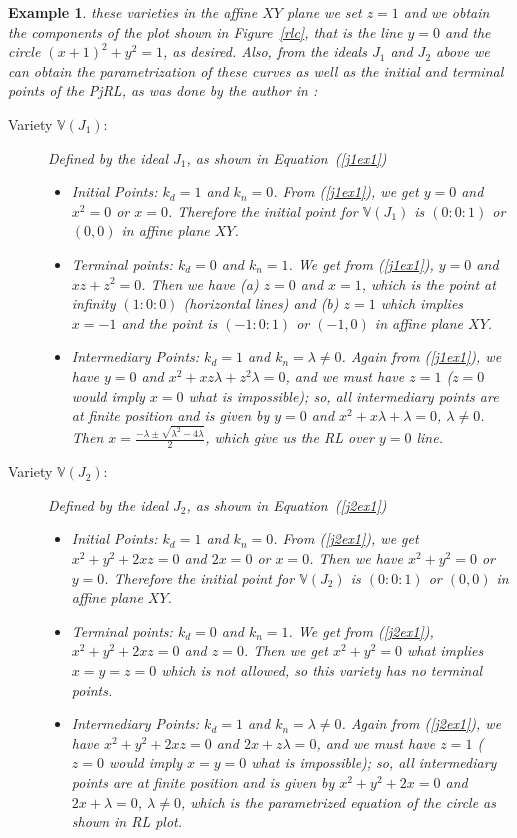 \documentclass{article}
\newtheorem{example}{Example}[section]
\begin{document}
\begin{example}
these varieties in the affine $XY$ plane we set $z=1$ and we obtain the components of the 
plot shown in Figure~\ref{rlc}, that is the line $y=0$ and the circle $(x+1)^2 +y^2 = 1$, as desired. Also, from 
the ideals $J_1$ and $J_2$ above we can obtain the parametrization of these curves as well as the initial and terminal
points of the PjRL, as was done by the author in \cite{pjrl}:
\begin{description}
\item[Variety $\mathbb V(J_1)$:] Defined by the ideal $J_1$, as shown in Equation~(\ref{j1ex1})
\begin{itemize}
\item Initial Points: $k_d=1$ and $k_n=0$. From (\ref{j1ex1}), we get $y=0$ and $x^2=0$ or $x=0$. Therefore the initial 
point 
for $\mathbb V(J_1)$ is $(0:0:1)$ or $(0,0)$ in affine plane $XY$.
\item Terminal points: $k_d=0$ and $k_n=1$. We get from (\ref{j1ex1}), $y=0$ and $xz+z^2=0$. Then we have (a) $z=0$ and 
$x=1$, which is
the point at infinity $(1:0:0)$ (horizontal lines) and (b) $z=1$ which implies $x=-1$ and the point is $(-1:0:1)$ or 
$(-1,0)$ in affine plane $XY$.
\item Intermediary Points: $k_d=1$ and $k_n=\lambda\neq 0$. Again from (\ref{j1ex1}), we have $y=0$ and 
$x^2+xz\lambda + z^2\lambda=0$,
and we must have $z=1$ ($z=0$ would imply $x=0$ what is impossible); so, all intermediary points are at finite position 
and is given by
$y=0$ and $x^2 + x\lambda + \lambda=0$, $\lambda\neq 0$. Then $x=\frac{-\lambda\pm\sqrt{\lambda^2-4\lambda}}{2}$, which 
give us the 
RL over $y=0$ line.

\end{itemize}

\item[Variety $\mathbb V(J_2)$:] Defined by the ideal $J_2$, as shown in Equation~(\ref{j2ex1})
\begin{itemize}
\item Initial Points: $k_d=1$ and $k_n=0$. From (\ref{j2ex1}), we get $x^2 + y^2 + 2xz=0$ and $2x=0$ or $x=0$. Then we 
have $x^2+y^2=0$
or $y=0$. Therefore the initial point for $\mathbb V(J_2)$ is $(0:0:1)$ or $(0,0)$ in affine plane $XY$.
\item Terminal points: $k_d=0$ and $k_n=1$. We get from (\ref{j2ex1}), $x^2 + y^2 + 2xz=0$ and $z=0$. Then we get 
$x^2 + y^2=0$ what
implies $x=y=z=0$ which is not allowed, so this variety has no terminal points.
\item Intermediary Points: $k_d=1$ and $k_n=\lambda\neq 0$. Again from (\ref{j2ex1}), we have $x^2 + y^2 + 2xz=0$ and 
$2x + z\lambda=0$,
and we must have $z=1$ ($z=0$ would imply $x=y=0$ what is impossible); so, all intermediary points are at finite 
position and is given by
$x^2 + y^2 + 2x = 0$ and $2x + \lambda=0$, $\lambda\neq 0$, which is the parametrized equation of the circle as 
shown in RL plot.


\end{itemize}
\end{description}
\end{example}
\end{document}
